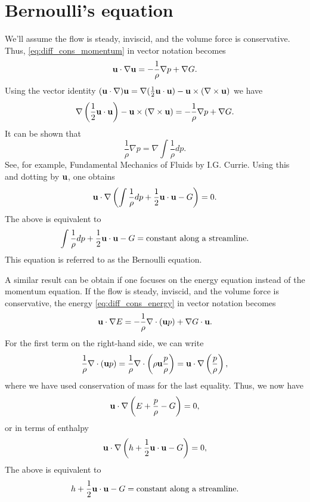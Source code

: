 \documentclass[oneside,a4paper,11pt]{report}
\begin{document}
\section{Bernoulli's equation}
We'll assume the flow is steady, inviscid, and the volume force is conservative. Thus, \cref{eq:diff_cons_momentum} in vector notation becomes
\begin{equation}
    \mathbf{u} \cdot \nabla \mathbf{u} = -\frac{1}{\rho} \nabla p + \nabla G.
\end{equation}
Using the vector identity $(\mathbf{u} \cdot \nabla) \mathbf{u} = \nabla (\frac{1}{2} \mathbf{u} \cdot \mathbf{u}) - \mathbf{u} \times (\nabla \times \mathbf{u}) $ we have
\begin{equation}
    \nabla \left (\frac{1}{2} \mathbf{u} \cdot \mathbf{u} \right) - \mathbf{u} \times (\nabla \times \mathbf{u}) = -\frac{1}{\rho} \nabla p + \nabla G.
\end{equation}
It can be shown that
\begin{equation}
    \frac{1}{\rho} \nabla p = \nabla \int \frac{1}{\rho} dp.
\end{equation}
See, for example, Fundamental Mechanics of Fluids by I.G. Currie. Using this and dotting by $\mathbf{u}$, one obtains
\begin{equation}
    \mathbf{u} \cdot \nabla \left ( \int \frac{1}{\rho} dp + \frac{1}{2} \mathbf{u} \cdot \mathbf{u} -G \right ) = 0.
\end{equation}
The above is equivalent to
\begin{equation}
\label{eq:bernoulli}
\int \frac{1}{\rho} dp + \frac{1}{2} \mathbf{u} \cdot \mathbf{u} -G = \text{constant along a streamline}.
\end{equation}
This equation is referred to as the Bernoulli equation.

A similar result can be obtain if one focuses on the energy equation instead of the momentum equation. If the flow is steady, inviscid, and the volume force is conservative, the energy \cref{eq:diff_cons_energy} in vector notation becomes
\begin{equation}
    \mathbf{u} \cdot \nabla E = - \frac{1}{\rho} \nabla \cdot (\mathbf{u} p) + \nabla G \cdot \mathbf{u}.
\end{equation}
For the first term on the right-hand side, we can write
\begin{equation}
    \frac{1}{\rho} \nabla \cdot (\mathbf{u} p) = \frac{1}{\rho} \nabla \cdot \left ( \rho \mathbf{u} \frac{p}{\rho} \right ) = \mathbf{u} \cdot \nabla \left ( \frac{p}{\rho} \right),
\end{equation}
where we have used conservation of mass for the last equality. Thus, we now have
\begin{equation}
     \mathbf{u} \cdot \nabla \left ( E + \frac{p}{\rho} -G \right ) = 0,
\end{equation}
or in terms of enthalpy
\begin{equation}
     \mathbf{u} \cdot \nabla \left ( h + \frac{1}{2} \mathbf{u} \cdot \mathbf{u} -G \right ) = 0,
\end{equation}
The above is equivalent to 
\begin{equation}
\label{eq:bernoulli_enthalpy}
    h + \frac{1}{2} \mathbf{u} \cdot \mathbf{u} -G = \text{constant along a streamline}.
\end{equation}
\end{document}
